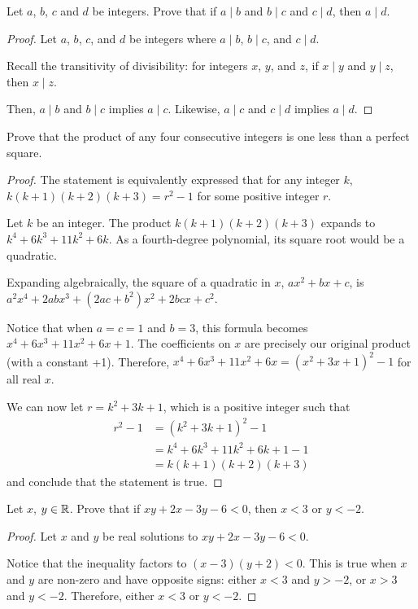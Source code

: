 \question Let $a$, $b$, $c$ and $d$ be integers.
Prove that if $a \mid b$ and $b \mid c$ and $c \mid d$, then $a \mid d$.
\begin{proof}
  Let $a$, $b$, $c$, and $d$ be integers where $a \mid b$, $b \mid c$, and $c \mid d$.

  Recall the transitivity of divisibility:
  for integers $x$, $y$, and $z$, if $x \mid y$ and $y \mid z$, then $x \mid z$.

  Then, $a \mid b$ and $b \mid c$ implies $a \mid c$.
  Likewise, $a \mid c$ and $c \mid d$ implies $a \mid d$.
\end{proof}


\question Prove that the product of any four consecutive integers is one less than a perfect square.
\begin{proof}
  The statement is equivalently expressed that for any integer $k$,
  $k(k+1)(k+2)(k+3)=r^2-1$ for some positive integer $r$.

  Let $k$ be an integer.
  The product $k(k+1)(k+2)(k+3)$ expands to $k^4 + 6k^3 + 11k^2 + 6k$.
  As a fourth-degree polynomial, its square root would be a quadratic.

  Expanding algebraically, the square of a quadratic in $x$, $ax^2+bx+c$, is $a^2x^4 + 2abx^3 + (2ac+b^2)x^2 + 2bcx + c^2$.

  Notice that when $a=c=1$ and $b=3$, this formula becomes $x^4 + 6x^3 + 11x^2 + 6x + 1$.
  The coefficients on $x$ are precisely our original product (with a constant +1).
  Therefore, $x^4 + 6x^3 + 11x^2 + 6x = (x^2+3x+1)^2 - 1$ for all real $x$.

  We can now let $r = k^2 + 3k + 1$, which is a positive integer such that
  \begin{align*}
    r^2-1
     & = (k^2 + 3k + 1)^2 - 1            \\
     & = k^4 + 6k^3 + 11k^2 + 6k + 1 - 1 \\
     & = k(k+1)(k+2)(k+3)
  \end{align*}
  and conclude that the statement is true.
\end{proof}


\question Let $x$, $y\in\mathbb{R}$. Prove that if $xy + 2x - 3y - 6 < 0$, then $x < 3$ or $y < -2$.
\begin{proof}
  Let $x$ and $y$ be real solutions to $xy + 2x - 3y - 6 < 0$.

  Notice that the inequality factors to $(x-3)(y+2) < 0$.
  This is true when $x$ and $y$ are non-zero and have opposite signs: either $x < 3$ and $y > -2$, or $x > 3$ and $y < -2$.
  Therefore, either $x < 3$ or $y < -2$.
\end{proof}


